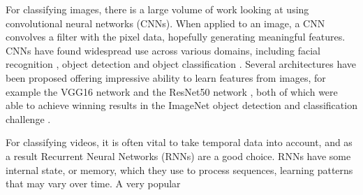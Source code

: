 \documentclass[sigconf]{acmart}
\begin{document}
For classifying images, there is a large volume of work looking at using
convolutional neural networks (CNNs). When applied to an image, a CNN
convolves a filter with the pixel data, hopefully generating meaningful features. 
CNNs have found widespread use across various domains, including facial
recognition \cite{lawrence1997face}, object detection and object classification
\cite{szegedy2014going}.
Several architectures have been proposed offering impressive ability to learn
features from images, for example the VGG16 network \cite{simonyan2014very} and the
ResNet50 network \cite{he2016deep}, both of which were able to achieve winning results in
the ImageNet object detection and classification challenge \cite{ILSVRC15}.

For classifying videos, it is often vital to take temporal data into account,
and as a result Recurrent Neural Networks (RNNs) \cite{rumelhart1985learning} are a good
choice. RNNs have some internal state, or memory, which they use to process
sequences, learning patterns that may vary over time. A very popular
\end{document}
